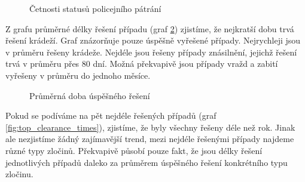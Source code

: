 \documentclass{article}
\begin{document}
\begin{figure}
  \centering
  \caption{Četnosti statusů policejního pátrání}
  \label{fig:clearance_status}
\end{figure}

Z grafu průměrné délky řešení případu (graf \ref{fig:clearance_time}) zjistíme, že nejkratší dobu trvá
řešení krádeží. Graf znázorňuje pouze úspěšně vyřešené případy. Nejrychleji jsou v průměru řešeny
krádeže. Nejdéle jsou řešeny případy znásilnění, jejichž řešení trvá v průměru přes 80 dní.
Možná překvapivě jsou případy vražd a zabití vyřešeny v průměru do jednoho měsíce.

\begin{figure}
  \centering
  \caption{Průměrná doba úspěšného řešení}
  \label{fig:clearance_time}
\end{figure}

Pokud se podíváme na pět nejdéle řešených případů (graf \ref{fig:top_clearance_times}), zjistíme, že byly
všechny řešeny déle než rok. Jinak ale nezjistíme žádný zajímavější trend, mezi nejdéle řešenými
případy najdeme různé typy zločinů. Překvapivě působí pouze fakt, že jsou délky řešení jednotlivých 
případů daleko za průměrem úspěšného řešení konkrétního typu zločinu.
\end{document}
